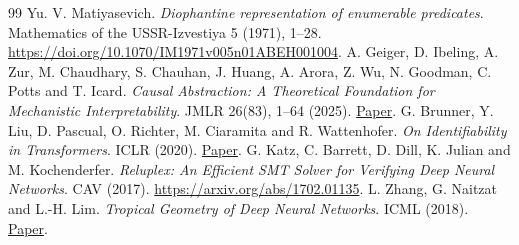 \documentclass[11pt,a4paper]{article}
\theoremstyle{definition}
\theoremstyle{remark}\newaliascnt{remark}{theorem}
\numberwithin{equation}{section}
\begin{document}
\begin{thebibliography}{99}
 Yu. V. Matiyasevich. \emph{Diophantine representation of enumerable predicates}. Mathematics of the USSR-Izvestiya 5 (1971), 1--28. \url{https://doi.org/10.1070/IM1971v005n01ABEH001004}.
 A. Geiger, D. Ibeling, A. Zur, M. Chaudhary, S. Chauhan, J. Huang, A. Arora, Z. Wu, N. Goodman, C. Potts and T. Icard. \emph{Causal Abstraction: A Theoretical Foundation for Mechanistic Interpretability}. JMLR 26(83), 1--64 (2025). \href{https://www.jmlr.org/papers/v26/23-0058.html}{Paper}.
 G. Brunner, Y. Liu, D. Pascual, O. Richter, M. Ciaramita and R. Wattenhofer. \emph{On Identifiability in Transformers}. ICLR (2020). \href{https://research.google/pubs/on-identifiability-in-transformers/}{Paper}.
 G. Katz, C. Barrett, D. Dill, K. Julian and M. Kochenderfer. \emph{Reluplex: An Efficient SMT Solver for Verifying Deep Neural Networks}. CAV (2017). \url{https://arxiv.org/abs/1702.01135}.
 L. Zhang, G. Naitzat and L.-H. Lim. \emph{Tropical Geometry of Deep Neural Networks}. ICML (2018). \href{https://proceedings.mlr.press/v80/zhang18i.html}{Paper}.

\end{thebibliography}
\end{document}
